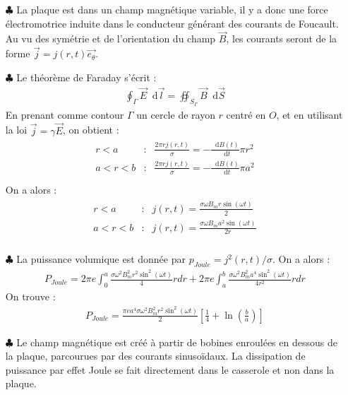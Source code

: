 \documentclass{report}
\newcommand*\dif{\mathop{}\!\mathrm{d}}
\begin{document}
\begin{itemize}

	\item[$\clubsuit$] La plaque est dans un champ magnétique variable, il y a donc une force électromotrice induite dans le conducteur générant des courants de Foucault. Au vu des symétrie et de l'orientation du champ $\vec{B}$, les courants seront de la forme $\vec{j}=j(r,t)\vec{e_\theta}$.
	
	\item[$\clubsuit$] Le théorème de Faraday s'écrit :
	\begin{align*}
		\oint_\Gamma\vec{E}\dif\vec{l}=\oiint_{S_\Gamma}\vec{B}\dif\vec{S}
	\end{align*}
	En prenant comme contour $\Gamma$ un cercle de rayon $r$ centré en $O$, et en utilisant la loi $\vec{j}=\gamma\vec{E}$, on obtient :
	\begin{align*}
	\begin{array}{ccc}
	r<a & : & \frac{2\pi rj(r,t)}{\sigma}=-\frac{\dif B(t)}{\dif t}\pi r^2\\
	a<r<b & : & \frac{2\pi rj(r,t)}{\sigma}=-\frac{\dif B(t)}{\dif t}\pi a^2\\
	\end{array}
	\end{align*}		
On a alors :
	\begin{align*}
	\begin{array}{ccc}
	r<a & : & j(r,t)=\frac{\sigma\omega B_m r\sin(\omega t)}{2}\\
	a<r<b & : &  j(r,t)=\frac{\sigma\omega B_m a^2\sin(\omega t)}{2r}\\
	\end{array}
	\end{align*}		
		
	\item[$\clubsuit$] La puissance volumique est donnée par $p_{Joule}= j^2(r,t)/\sigma$. On a alors :
	\begin{align*}
		P_{Joule}=2\pi e\int_0^a \frac{\sigma\omega^2 B_m^2 r^2\sin^2(\omega t)}{4}rdr+2\pi e\int_a^b \frac{\sigma\omega^2 B_m^2 a^4\sin^2(\omega t)}{4r^2}rdr
	\end{align*}
	On trouve :
	\begin{align*}
		P_{Joule}=\frac{\pi e a^4\sigma\omega^2 B_m^2 r^2\sin^2(\omega t)}{2}\left[\frac{1}{4} + \ln\left(\frac{b}{a} \right)  \right] 
	\end{align*}
	
	\item[$\clubsuit$] Le champ magnétique est créé à partir de bobines enroulées en dessous de la plaque, parcourues par des courants sinusoïdaux. La dissipation de puissance par effet Joule se fait directement dans le casserole et non dans la plaque.
	

\end{itemize}
\end{document}
